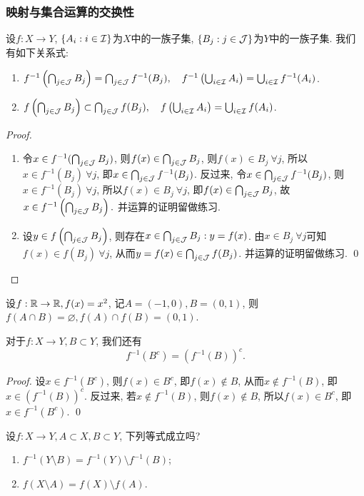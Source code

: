 \subsubsection*{映射与集合运算的交换性}
    设$f: X \to Y$, $\{A_i: i \in \mathcal{I} \}$为$X$中的一族子集, $\{B_j: j \in \mathcal{J} \}$为$Y$中的一族子集. 我们有如下关系式:
    \begin{enumerate}
    \item $f^{-1}\left(\bigcap_{j \in \mathcal{J}}B_j\right) = \bigcap_{j \in \mathcal{J}} f^{-1}(B_j), \quad 
           f^{-1}\left(\bigcup_{i \in \mathcal{I}}A_i\right) = \bigcup_{i \in \mathcal{I}} f^{-1}(A_i)$.
    \item $f\left(\bigcap_{j\in \mathcal{J}}B_j\right) \subset \bigcap_{j \in \mathcal{J}} f(B_j), \quad  
           f\left(\bigcup_{i \in \mathcal{I}}A_i\right) = \bigcup_{i \in \mathcal{I}} f(A_i)$.
    \end{enumerate}
\begin{proof}
    \begin{enumerate}
    \item 令$x \in f^{-1}(\bigcap_{j \in \mathcal{J}}B_j)$, 则$f(x) \in \bigcap_{j \in \mathcal{J}}B_j$, 则$f(x) \in B_j ~\forall j$, 所以$x \in f^{-1}(B_j)~\forall j$, 即$x \in \bigcap_{j \in \mathcal{J}}f^{-1}(B_j)$. 反过来, 令$x \in \bigcap_{j \in \mathcal{J}}f^{-1}(B_j)$, 则$x \in f^{-1}(B_j)~\forall j$, 所以$f(x) \in B_j~\forall j$, 即$f(x) \in \bigcap_{j \in \mathcal{J}}B_j$, 故$x \in f^{-1}\left(\bigcap_{j \in \mathcal{J}}B_j\right).$  并运算的证明留做练习. 
    \item 设$y \in f\left(\bigcap_{j \in \mathcal{J}}B_j\right)$, 则存在$x \in \bigcap_{j \in \mathcal{J}}B_j: y = f(x)$. 由$x \in B_j~\forall j$可知$f(x) \in f(B_j)~\forall j$, 从而$y = f(x) \in \bigcap_{j \in \mathcal{J}}f(B_j)$. 并运算的证明留做练习. \qed 
    \end{enumerate} 
\end{proof}
\begin{example}
    设$f: \mathbb{R} \to \mathbb{R}, f(x) = x^2$, 记$A = (-1,0), B = (0,1)$, 则$f(A \cap B)=\varnothing, f(A) \cap f(B) = (0,1)$. 
\end{example}

对于$f:X \to Y, B \subset Y$, 我们还有
$$f^{-1}(B^c) = (f^{-1}(B))^c. $$
\begin{proof}
    设$x \in f^{-1}(B^c)$, 则$f(x) \in B^c$, 即$f(x) \notin B$, 从而$x \notin f^{-1}(B)$, 即$x \in (f^{-1}(B))^c$. 反过来, 若$x \notin f^{-1}(B)$, 则$f(x) \notin B$, 所以$f(x) \in B^c$, 即$x \in f^{-1}(B^c)$. \qed
\end{proof}

\begin{exercise}
    设$f: X \to Y, A \subset X, B \subset Y$, 下列等式成立吗?
    \begin{enumerate}
    \item $f^{-1}(Y \setminus B) = f^{-1}(Y) \setminus f^{-1}(B)$;
    \item $f(X \setminus A) = f(X) \setminus f(A)$. 
    \end{enumerate}
\end{exercise}